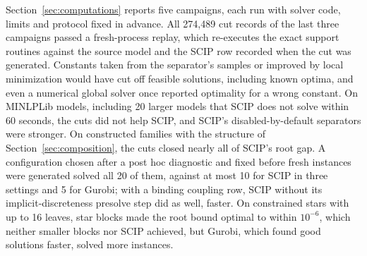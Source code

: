 Section~\ref{sec:computations} reports five campaigns, each run with solver
code, limits and protocol fixed in advance. All 274{,}489 cut records of the
last three campaigns passed a fresh-process replay, which re-executes the exact
support routines against the source model and the SCIP row recorded when the
cut was generated. Constants taken from the separator's samples or improved by
local minimization would have cut off feasible solutions, including known
optima, and even a numerical global solver once reported optimality for a
wrong constant. On MINLPLib models, including 20 larger models that SCIP does
not solve within 60 seconds, the cuts did not help SCIP, and SCIP's
disabled-by-default separators were stronger. On constructed families with the
structure of Section~\ref{sec:composition}, the cuts closed nearly all of SCIP's
root gap. A configuration chosen after a post hoc diagnostic and fixed before
fresh instances were generated solved all 20 of them, against at most 10 for
SCIP in three settings and 5 for Gurobi; with a binding coupling row, SCIP
without its implicit-discreteness presolve step did as well, faster. On
constrained stars with up to 16 leaves, star blocks made the root bound optimal
to within $10^{-6}$, which neither smaller blocks nor SCIP achieved, but
Gurobi, which found good solutions faster, solved more instances.
